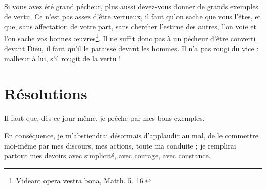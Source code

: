 \documentclass[instructions.tex]{subfiles}
\begin{document}
Si vous avez été grand pécheur, plus aussi devez-vous donner de grands exemples de vertu. Ce n’est pas assez d’être vertueux, il faut qu’on sache que vous l’êtes, et que, sans affectation de votre part, sans chercher l’estime des autres, l’on voie et l’on sache vos bonnes œuvres\footnote{Videant opera vestra bona, Matth. 5. 16.}. Il ne suffit donc pas à un pécheur d’être converti devant Dieu, il faut qu’il le paraisse devant les hommes. Il n’a pas rougi du vice : malheur à lui, s’il rougit de la vertu !
 
\section{Résolutions}
 
\primo Il faut que, dès ce jour même, je prêche par mes bons exemples.
 
\secundo En conséquence, je m’abstiendrai désormais d’applaudir au mal, de le commettre moi-même par mes discours, mes actions, toute ma conduite ; je remplirai partout mes devoirs avec simplicité, avec courage, avec constance.

 
\end{document}
